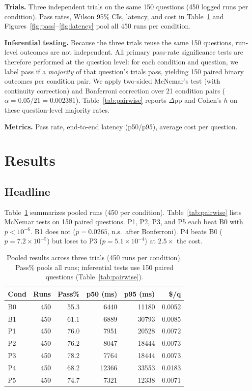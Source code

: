 \documentclass{article}
\begin{document}
\textbf{Trials.} Three independent trials on the same 150 questions (450 logged runs per condition). Pass rates, Wilson 95\% CIs, latency, and cost in Table~\ref{tab:pooled} and Figures~\ref{fig:pass}--\ref{fig:latency} pool all 450 runs per condition.

\textbf{Inferential testing.} Because the three trials reuse the same 150 questions, run-level outcomes are not independent. All primary pass-rate significance tests are therefore performed at the question level: for each condition and question, we label pass if a \emph{majority} of that question's trials pass, yielding 150 paired binary outcomes per condition pair. We apply two-sided McNemar's test (with continuity correction) and Bonferroni correction over 21 condition pairs ($\alpha{=}0.05/21{=}0.002381$). Table~\ref{tab:pairwise} reports $\Delta$pp and Cohen's $h$ on these question-level majority rates.

\textbf{Metrics.} Pass rate, end-to-end latency (p50/p95), average cost per question.

\section{Results}
\label{sec:results}

\subsection{Headline}
Table~\ref{tab:pooled} summarizes pooled runs (450 per condition). Table~\ref{tab:pairwise} lists McNemar tests on 150 paired questions. P1, P2, P3, and P5 each beat B0 with $p < 10^{-6}$. B1 does not ($p{=}0.0265$, n.s.\ after Bonferroni). P4 beats B0 ($p{=}7.2\times 10^{-5}$) but loses to P3 ($p{=}5.1\times 10^{-4}$) at $2.5\times$ the cost.

\begin{table}[t]
  \caption{Pooled results across three trials (450 runs per condition). Pass\% pools all runs; inferential tests use 150 paired questions (Table~\ref{tab:pairwise}).}
  \label{tab:pooled}
  \centering
  \small
  \begin{tabular}{lrrrrr}
    \toprule
    Cond & Runs & Pass\% & p50 (ms) & p95 (ms) & \$/q \\
    \midrule
    B0 & 450 & 55.3 & 6440 & 11180 & 0.0052 \\
    B1 & 450 & 61.1 & 6889 & 30793 & 0.0085 \\
    P1 & 450 & 76.0 & 7951 & 20528 & 0.0072 \\
    P2 & 450 & 76.2 & 8047 & 18444 & 0.0073 \\
    P3 & 450 & 78.2 & 7764 & 18444 & 0.0073 \\
    P4 & 450 & 68.2 & 12366 & 33553 & 0.0183 \\
    P5 & 450 & 74.7 & 7321 & 12338 & 0.0071 \\
    \bottomrule
  \end{tabular}
\end{table}
\end{document}
